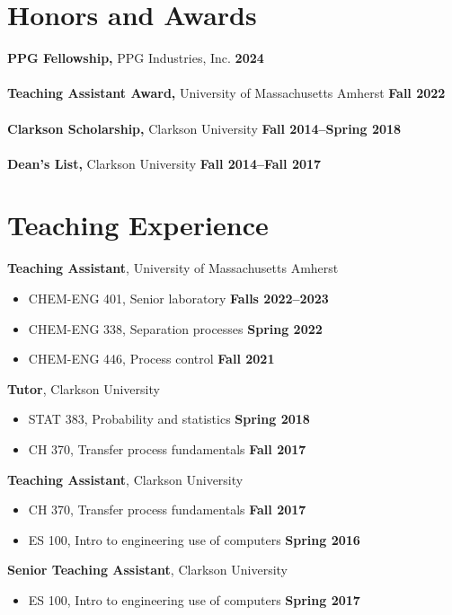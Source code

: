 \documentclass[margin,line]{res}
\begin{document}
\begin{resume}
	\section{\sc Honors and Awards}
	 {\bf PPG Fellowship,} PPG Industries, Inc. \hfill {\bf 2024}\\
	\\
	{\bf Teaching Assistant Award,} University of Massachusetts Amherst \hfill {\bf Fall 2022}\\
	\\
	{\bf Clarkson Scholarship,} Clarkson University \hfill {\bf Fall 2014--Spring 2018}\\
	\\
	{\bf Dean's List,} Clarkson University \hfill {\bf Fall 2014--Fall 2017}\\

	\vspace{-1em}

	\section{\sc Teaching Experience}
	 {\bf Teaching Assistant}, University of Massachusetts Amherst
	\vspace*{.05in}
	\begin{itemize}
		\item[ ] CHEM-ENG 401, Senior laboratory \hfill {\bf Falls 2022--2023}
		\item[ ] CHEM-ENG 338, Separation processes \hfill {\bf Spring 2022}
		\item[ ] CHEM-ENG 446, Process control \hfill {\bf Fall 2021}
	\end{itemize}
	{\bf Tutor}, Clarkson University
	\vspace*{.05in}
	\begin{itemize}
		\item[ ] STAT 383, Probability and statistics \hfill {\bf Spring 2018}
		\item[ ] CH 370, Transfer process fundamentals \hfill {\bf Fall 2017}
	\end{itemize}
	{\bf Teaching Assistant}, Clarkson University
	\vspace*{.05in}
	\begin{itemize}
		\item[ ] CH 370, Transfer process fundamentals \hfill {\bf Fall 2017}
		\item[ ] ES 100, Intro to engineering use of computers \hfill {\bf Spring 2016}
	\end{itemize}
	{\bf Senior Teaching Assistant}, Clarkson University
	\vspace*{.05in}
	\begin{itemize}
		\item[ ] ES 100, Intro to engineering use of computers \hfill {\bf Spring 2017}
	\end{itemize}


\end{resume}
\end{document}
